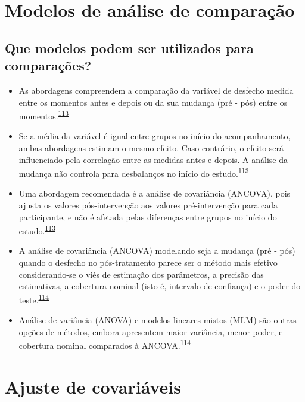 \documentclass[
]{book}
\begin{document}
\hypertarget{metodos-comparacao}{%
\section{Modelos de análise de comparação}\label{metodos-comparacao}}

\hypertarget{que-modelos-podem-ser-utilizados-para-comparauxe7uxf5es}{%
\subsection{Que modelos podem ser utilizados para comparações?}\label{que-modelos-podem-ser-utilizados-para-comparauxe7uxf5es}}

\begin{itemize}
\item
  As abordagens compreendem a comparação da variável de desfecho medida entre os momentos antes e depois ou da sua mudança (pré - pós) entre os momentos.\textsuperscript{\protect\hyperlink{ref-Vickers2001}{113}}
\item
  Se a média da variável é igual entre grupos no início do acompanhamento, ambas abordagens estimam o mesmo efeito. Caso contrário, o efeito será influenciado pela correlação entre as medidas antes e depois. A análise da mudança não controla para desbalanços no início do estudo.\textsuperscript{\protect\hyperlink{ref-Vickers2001}{113}}
\item
  Uma abordagem recomendada é a análise de covariância (ANCOVA), pois ajusta os valores pós-intervenção aos valores pré-intervenção para cada participante, e não é afetada pelas diferenças entre grupos no início do estudo.\textsuperscript{\protect\hyperlink{ref-Vickers2001}{113}}
\item
  A análise de covariância (ANCOVA) modelando seja a mudança (pré - pós) quando o desfecho no pós-tratamento parece ser o método mais efetivo considerando-se o viés de estimação dos parâmetros, a precisão das estimativas, a cobertura nominal (isto é, intervalo de confiança) e o poder do teste.\textsuperscript{\protect\hyperlink{ref-OConnell2017}{114}}
\item
  Análise de variância (ANOVA) e modelos lineares mistos (MLM) são outras opções de métodos, embora apresentem maior variância, menor poder, e cobertura nominal comparados à ANCOVA.\textsuperscript{\protect\hyperlink{ref-OConnell2017}{114}}
\end{itemize}

\hypertarget{ajuste-de-covariaveis}{%
\section{Ajuste de covariáveis}\label{ajuste-de-covariaveis}}
\end{document}
